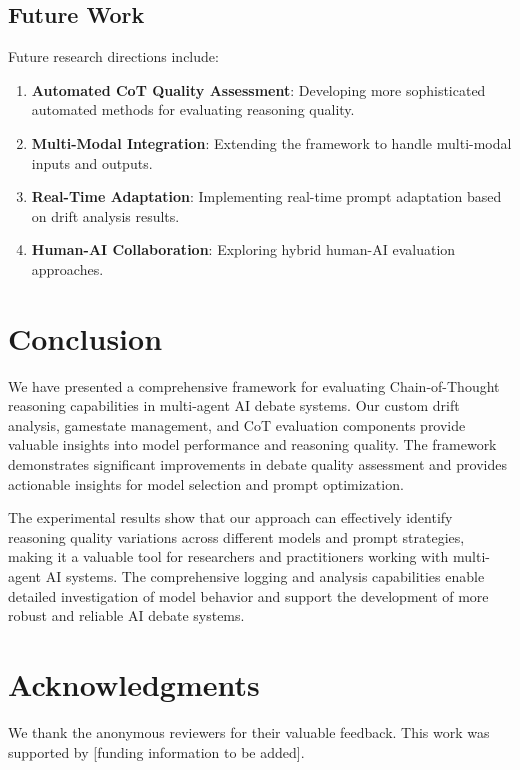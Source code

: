 \documentclass[11pt]{article}
\begin{document}
\subsection{Future Work}

Future research directions include:

\begin{enumerate}
    \item \textbf{Automated CoT Quality Assessment}: Developing more sophisticated automated methods for evaluating reasoning quality.
    \item \textbf{Multi-Modal Integration}: Extending the framework to handle multi-modal inputs and outputs.
    \item \textbf{Real-Time Adaptation}: Implementing real-time prompt adaptation based on drift analysis results.
    \item \textbf{Human-AI Collaboration}: Exploring hybrid human-AI evaluation approaches.
\end{enumerate}

\section{Conclusion}

We have presented a comprehensive framework for evaluating Chain-of-Thought reasoning capabilities in multi-agent AI debate systems. Our custom drift analysis, gamestate management, and CoT evaluation components provide valuable insights into model performance and reasoning quality. The framework demonstrates significant improvements in debate quality assessment and provides actionable insights for model selection and prompt optimization.

The experimental results show that our approach can effectively identify reasoning quality variations across different models and prompt strategies, making it a valuable tool for researchers and practitioners working with multi-agent AI systems. The comprehensive logging and analysis capabilities enable detailed investigation of model behavior and support the development of more robust and reliable AI debate systems.

\section*{Acknowledgments}

We thank the anonymous reviewers for their valuable feedback. This work was supported by [funding information to be added].
\end{document}
